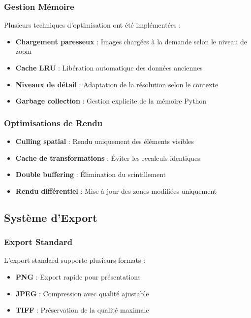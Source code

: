 \documentclass[12pt,a4paper]{article}
\begin{document}
\subsubsection{Gestion Mémoire}

Plusieurs techniques d'optimisation ont été implémentées :

\begin{itemize}
\item \textbf{Chargement paresseux} : Images chargées à la demande selon le niveau de zoom
\item \textbf{Cache LRU} : Libération automatique des données anciennes
\item \textbf{Niveaux de détail} : Adaptation de la résolution selon le contexte
\item \textbf{Garbage collection} : Gestion explicite de la mémoire Python
\end{itemize}

\subsubsection{Optimisations de Rendu}

\begin{itemize}
\item \textbf{Culling spatial} : Rendu uniquement des éléments visibles
\item \textbf{Cache de transformations} : Éviter les recalculs identiques
\item \textbf{Double buffering} : Élimination du scintillement
\item \textbf{Rendu différentiel} : Mise à jour des zones modifiées uniquement
\end{itemize}

\subsection{Système d'Export}

\subsubsection{Export Standard}

L'export standard supporte plusieurs formats :
\begin{itemize}
\item \textbf{PNG} : Export rapide pour présentations
\item \textbf{JPEG} : Compression avec qualité ajustable
\item \textbf{TIFF} : Préservation de la qualité maximale
\end{itemize}
\end{document}
